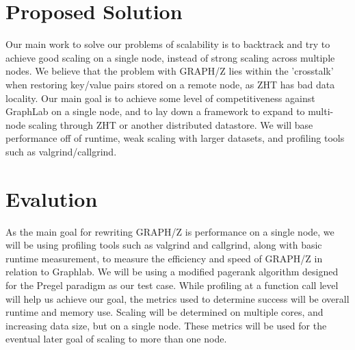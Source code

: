 \documentclass[10pt]{article}
\begin{document}
\begin{multicols}{2}
  \section{Proposed Solution}
  Our main work to solve our problems of scalability is to backtrack and try to achieve good scaling on a single node, instead of strong scaling across multiple nodes. We believe that the problem with GRAPH/Z lies within the 'crosstalk' when restoring key/value pairs stored on a remote node, as ZHT has bad data locality. Our main goal is to achieve some level of competitiveness against GraphLab on a single node, and to lay down a framework to expand to multi-node scaling through ZHT or another distributed datastore. We will base performance off of runtime, weak scaling with larger datasets, and profiling tools such as valgrind/callgrind.
  \section{Evalution}
  As the main goal for rewriting GRAPH/Z is performance on a single node, we will be using profiling tools such as valgrind and callgrind, along with basic runtime measurement, to measure the efficiency and speed of GRAPH/Z in relation to Graphlab. We will be using a modified pagerank algorithm designed for the Pregel paradigm as our test case. While profiling at a function call level will help us achieve our goal, the metrics used to determine success will be overall runtime and memory use. Scaling will be determined on multiple cores, and increasing data size, but on a single node.  These metrics will be used for the eventual later goal of scaling to more than one node.
\end{multicols}
\end{document}
